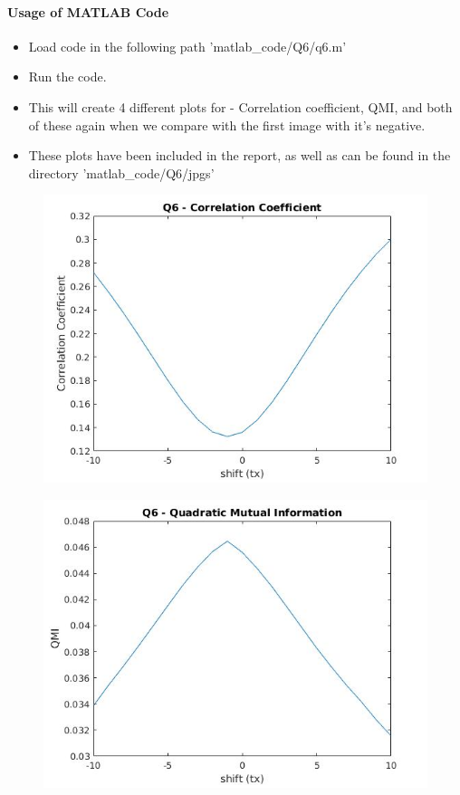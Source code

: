 \documentclass[12pt]{article}
\begin{document}
\paragraph{Usage of MATLAB Code}
\begin{itemize}
\item Load code in the following path 'matlab\_code/Q6/q6.m'
\item Run the code.
\item This will create 4 different plots for - Correlation coefficient, QMI, and both of these again when we compare with the first image with it's negative. 
\item These plots have been included in the report, as well as can be found in the directory 'matlab\_code/Q6/jpgs'
\end{itemize}


\begin{figure} [h!]
\includegraphics[width=\linewidth]{corr.jpg}
\caption{}
\label{fig:6.1}
\end{figure}

\begin{figure}[h!]
\includegraphics[width=\linewidth]{qmi.jpg}
\caption{}
\label{fig:6.2}
\end{figure}
\end{document}
